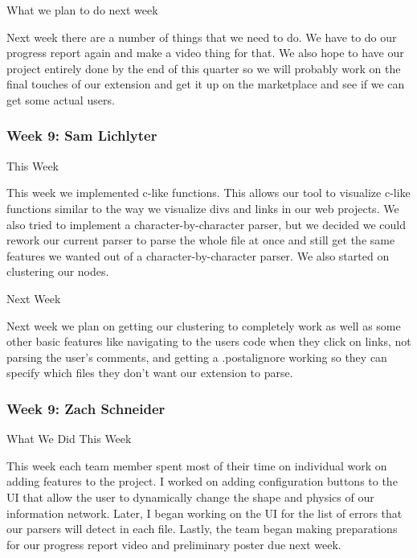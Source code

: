What we plan to do next week



Next week there are a number of things that we need to do. We have to do our progress report again and make a video thing for that. We also hope to have our project entirely done by the end of this quarter so we will probably work on the final touches of our extension and get it up on the marketplace and see if we can get some actual users.  \\ 

 \subsubsection{Week 9: Sam Lichlyter}

This Week



This week we implemented c-like functions. This allows our tool to visualize c-like functions similar to the way we visualize divs and links in our web projects. We also tried to implement a character-by-character parser, but we decided we could rework our current parser to parse the whole file at once and still get the same features we wanted out of a character-by-character parser. We also started on clustering our nodes.



Next Week



Next week we plan on getting our clustering to completely work as well as some other basic features like navigating to the users code when they click on links, not parsing the user's comments, and getting a .postalignore working so they can specify which files they don't want our extension to parse.  \\ 

 \subsubsection{Week 9: Zach Schneider}

What We Did This Week

This week each team member spent most of their time on individual work on adding features to the project. I worked on adding configuration buttons to the UI that allow the user to dynamically change the shape and physics of our information network. Later, I began working on the UI for the list of errors that our parsers will detect in each file. Lastly, the team began making preparations for our progress report video and preliminary poster due next week.



